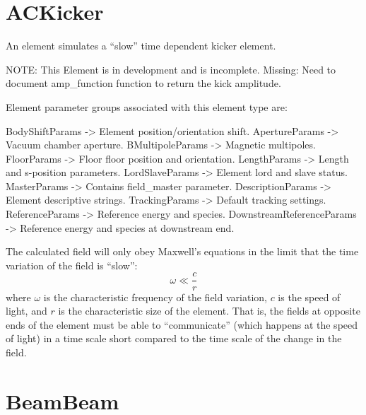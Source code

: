 \newpage

\section{ACKicker}
\label{s:ackicker}

An  element simulates a ``slow'' time dependent kicker element.

NOTE: This Element is in development and is incomplete. 
Missing: Need to document amp_function function to return the kick amplitude.

Element parameter groups associated with this element type are:
\TOPrule 
\begin{example}
  BodyShiftParams     -> Element position/orientation shift.  
  ApertureParams      -> Vacuum chamber aperture.  
  BMultipoleParams    -> Magnetic multipoles.  
  FloorParams -> Floor floor position and orientation.  
  LengthParams        -> Length and s-position parameters.  
  LordSlaveParams     -> Element lord and slave status.  
  MasterParams        -> Contains field_master parameter.  
  DescriptionParams   -> Element descriptive strings.  
  TrackingParams      -> Default tracking settings.  
  ReferenceParams     -> Reference energy and species. 
  DownstreamReferenceParams -> Reference energy and species at downstream end. 
\end{example}
\BOTTOMrule


The calculated field will only obey Maxwell's equations in the limit that the time variation
of the field is ``slow'':
\begin{equation}
  \omega \ll \frac{c}{r}
\end{equation}
where $\omega$ is the characteristic frequency of the field variation, $c$ is the speed of light,
and $r$ is the characteristic size of the  element. That is, the fields at opposite
ends of the element must be able to ``communicate'' (which happens at the speed of light) in a time
scale short compared to the time scale of the change in the field.

\newpage

\section{BeamBeam}
\label{s:beambeam}

